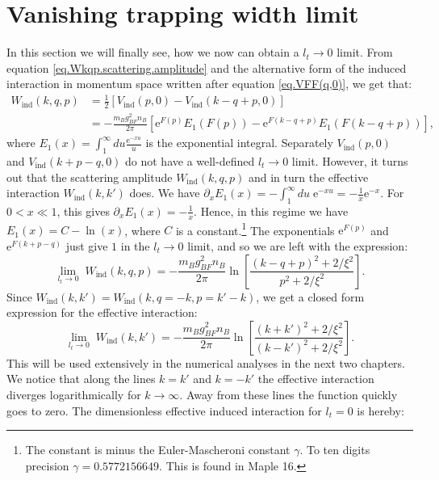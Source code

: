\section{Vanishing trapping width limit} \label{sec.Vanishingtrappingwidtlimit}
In this section we will finally see, how we now can obtain a $l_t\to 0$ limit. From equation \eqref{eq.Wkqp.scattering.amplitude} and the alternative form of the induced interaction in momentum space written after equation \eqref{eq.VFF(q,0)}, we get that:
\begin{align}
W_{\text{ind}}(k, q, p) &= \frac{1}{2}\left[V_\text{ind}(p, 0) - V_\text{ind}(k - q + p, 0)\right] \nonumber \\
&= -\frac{m_Bg_{BF}^2n_B}{2\pi}\left[ \text{e}^{F(p)} E_1(F(p)) - \text{e}^{F(k - q + p)} E_1(F(k - q + p)) \right], \nonumber
\end{align}
where $E_1(x) = \int_1^\infty du \frac{\text{e}^{-xu}}{u}$ is the exponential integral. Separately $V_\text{ind}(p,0)$ and $V_\text{ind}(k + p - q,0)$ do not have a well-defined $l_t \to 0$ limit. However, it turns out that the scattering amplitude $W_{\text{ind}}(k, q, p)$ and in turn the effective interaction $W_{\text{ind}}(k,k')$ does. We have $\partial_x E_1(x) = -\int_1^{\infty}du\; \text{e}^{-xu} = -\frac{1}{x}\text{e}^{-x}$. For $0<x\ll 1$, this gives $\partial_xE_1(x) = -\frac{1}{x}$. Hence, in this regime we have $E_1(x) = C -\ln(x)$, where $C$ is a constant.\footnote{The constant is minus the Euler-Mascheroni constant $\gamma$. To ten digits precision $\gamma = 0.5772156649$. This is found in Maple 16.} The exponentials $\text{e}^{F(p)}$ and $\text{e}^{F(k + p - q)}$ just give $1$ in the $l_t \to 0$ limit, and so we are left with the expression:
\begin{equation}
\lim_{l_t \to 0} \; W_{\text{ind}}(k, q, p) = -\frac{m_Bg_{BF}^2n_B}{2\pi} \ln\left[\frac{(k - q + p)^2+2/\xi^2}{p^2+2/\xi^2}\right].
\label{eq.Wkqp.scattering.amplitude.lt=0} 
\end{equation}
Since $W_{\text{ind}}(k, k') = W_{\text{ind}}(k, q = -k, p = k' - k) $, we get a closed form expression for the effective interaction:
\begin{equation}
\lim_{l_t \to 0} \; W_{\text{ind}}(k, k') = -\frac{m_Bg_{BF}^2n_B}{2\pi} \ln\left[\frac{(k + k')^2+2/\xi^2}{(k - k')^2+2/\xi^2}\right].
\label{eq.EffectiveInteractionlt=0} 
\end{equation}
This will be used extensively in the numerical analyses in the next two chapters. We notice that along the lines $k = k'$ and $k = -k'$ the effective interaction diverges logarithmically for $k\to \infty$. Away from these lines the function quickly goes to zero. The dimensionless effective induced interaction for $l_t = 0$ is hereby:
